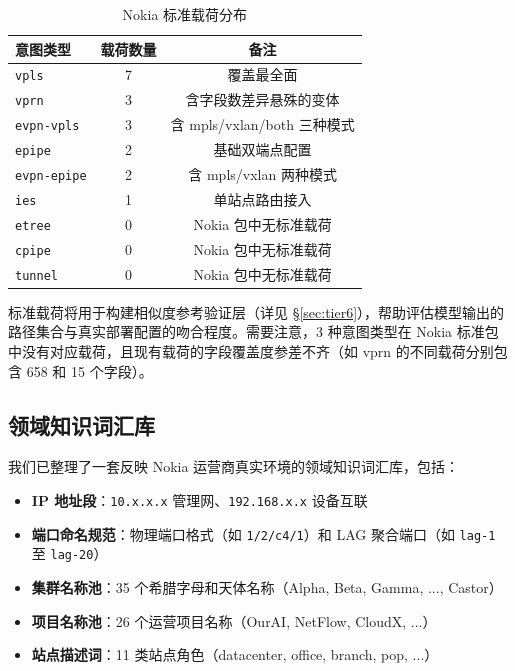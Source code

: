 \documentclass[12pt, a4paper]{article}
\newcommand{\intenttype}[1]{\texttt{#1}}
\begin{document}
\begin{table}[H]
\centering
\caption{Nokia 标准载荷分布}
\label{tab:canonical-payloads}
\small
\begin{tabular}{lcc}
\toprule
\textbf{意图类型} & \textbf{载荷数量} & \textbf{备注} \\
\midrule
\intenttype{vpls}        & 7 & 覆盖最全面 \\
\intenttype{vprn}        & 3 & 含字段数差异悬殊的变体 \\
\intenttype{evpn-vpls}   & 3 & 含 mpls/vxlan/both 三种模式 \\
\intenttype{epipe}       & 2 & 基础双端点配置 \\
\intenttype{evpn-epipe}  & 2 & 含 mpls/vxlan 两种模式 \\
\intenttype{ies}         & 1 & 单站点路由接入 \\
\midrule
\intenttype{etree}       & 0 & Nokia 包中无标准载荷 \\
\intenttype{cpipe}       & 0 & Nokia 包中无标准载荷 \\
\intenttype{tunnel}      & 0 & Nokia 包中无标准载荷 \\
\bottomrule
\end{tabular}
\end{table}

\noindent
标准载荷将用于构建相似度参考验证层（详见 \S\ref{sec:tier6}），帮助评估模型输出的路径集合与真实部署配置的吻合程度。需要注意，3 种意图类型在 Nokia 标准包中没有对应载荷，且现有载荷的字段覆盖度参差不齐（如 vprn 的不同载荷分别包含 658 和 15 个字段）。

\subsection{领域知识词汇库}

我们已整理了一套反映 Nokia 运营商真实环境的领域知识词汇库，包括：

\begin{itemize}
  \item \textbf{IP 地址段}：\texttt{10.x.x.x} 管理网、\texttt{192.168.x.x} 设备互联
  \item \textbf{端口命名规范}：物理端口格式（如 \texttt{1/2/c4/1}）和 LAG 聚合端口（如 \texttt{lag-1} 至 \texttt{lag-20}）
  \item \textbf{集群名称池}：35 个希腊字母和天体名称（Alpha, Beta, Gamma, ..., Castor）
  \item \textbf{项目名称池}：26 个运营项目名称（OurAI, NetFlow, CloudX, ...）
  \item \textbf{站点描述词}：11 类站点角色（datacenter, office, branch, pop, ...）
\end{itemize}
\end{document}
